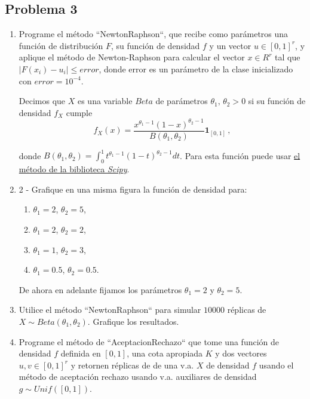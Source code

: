 \subsection*{Problema 3}
\begin{enumerate}
    \item Programe el método ``NewtonRaphson``, que recibe como parámetros una función de distribución $F$, su función de densidad $f$ y un vector $u \in [0, 1]^r$, y aplique el método de Newton-Raphson para calcular el vector $x \in R^r$ tal que $|F(x_i) - u_i|\leq error$, donde error es un parámetro de la clase inicializado con $error=10^{-4}$.
    
    Decimos que $X$ es una variable $Beta$ de parámetros $\theta_1,\,\theta_2>0$ si su función de densidad $f_X$ cumple
    $$ f_X(x) = \frac{x^{\theta_1-1}(1-x)^{\theta_2-1}}{B(\theta_1,\theta_2)}\mathbf{1}_{[0,1]} \, ,$$

    donde $B(\theta_1,\theta_2) = \displaystyle\int^1_0 t^{\theta_1-1}(1-t)^{\theta_2-1}dt$. Para esta función puede usar \href{https://docs.scipy.org/doc/scipy/reference/generated/scipy.special.beta.html}{el método de la biblioteca \textit{Scipy}}.
    
    \item 2 - Grafique en una misma figura la función de densidad para:
    \begin{enumerate}
        \item $\theta_1 = 2$, $\theta_2 = 5$,
        \item $\theta_1 = 2$, $\theta_2 = 2$,
        \item $\theta_1 = 1$, $\theta_2 = 3$,
        \item $\theta_1 = 0.5$, $\theta_2 = 0.5$.
    \end{enumerate}
    
    De ahora en adelante fijamos los parámetros $\theta_1=2$ y $\theta_2=5$.

    \item Utilice el método ``NewtonRaphson`` para simular $10000$ réplicas de $X\sim Beta(\theta_1,\theta_2)$. Grafique los resultados.
    
    \item Programe el método de ``AceptacionRechazo`` que tome una función de densidad $f$ definida en $[0,1]$, una cota apropiada $K$ y dos vectores $u,v\in[0,1]^r$ y retornen réplicas de de una v.a. $X$ de densidad $f$ usando el método de aceptación rechazo usando v.a. auxiliares de densidad $g\sim Unif([0,1])$.
    

\end{enumerate}
